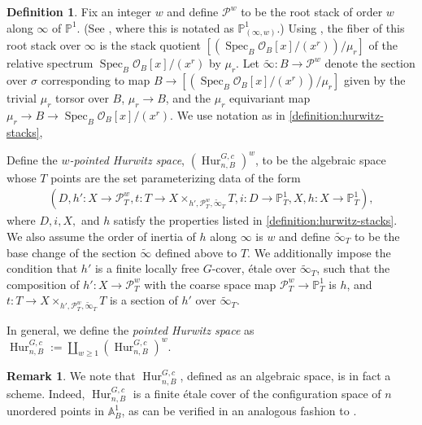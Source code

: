 \documentclass[12 pt]{amsart}
\theoremstyle{plain}
\theoremstyle{definition}
\newtheorem{definition}[theorem]{Definition}
\newtheorem{remark}[theorem]{Remark}
\theoremstyle{remark}
\numberwithin{equation}{section}
\DeclareMathOperator\spec{Spec}
\newcommand{\phur}[4]{\operatorname{Hur}^{#1, #3}_{#2,#4}}
\begin{document}
\begin{definition}
	\label{definition:pointed-hurwitz-space}
	Fix an integer $w$ and define $\mathscr P^w$ to be the root stack of order $w$ along
	$\infty$ of $\mathbb P^1$. (See \cite[Definition
		2.2.4]{cadman:using-stacks-to-impose-tangency}, where this is
	notated as $\mathbb P^1_{(\infty, w)}$.) 
	Using \cite[Theorem 10.3.10(ii)]{olsson2016algebraic}, 
	the fiber of this root
	stack over $\infty$ is the stack quotient 
$[\left(\spec_B \mathscr O_B[x]/(x^r)\right)/ \mu_r]$ of the relative spectrum $\spec_B \mathscr
O_B[x]/(x^r)$ by $\mu_r$. Let $\widetilde{\infty} : B \to \mathscr P^w$ denote the section over $\sigma$ corresponding to map $B
	\to [\left(\spec_B \mathscr
	O_B[x]/(x^r) \right)/ \mu_r]$ given by the trivial $\mu_r$ torsor over
	$B$, $\mu_{r} \to
	B$, and the $\mu_r$ equivariant map $\mu_{r} \to B \to \spec_B \mathscr
	O_B[x]/(x^r)$.
	We use notation as in \autoref{definition:hurwitz-stacks},

	Define the {\em $w$-pointed Hurwitz space}, $\left(\phur G n c B
	\right)^w$, to be the algebraic space
	whose $T$ points are the set parameterizing data of the form
	\begin{align*}
		\left( D, h': X \to \mathscr
		P^w_T, t: T \to X
		\times_{h',\mathscr P^w_T, \widetilde{\infty}_T} T, i:
	D \to \mathbb P^1_T, X, h: X \to \mathbb P^1_T  \right),
	\end{align*}
	where $D, i,X,$ and $h$ satisfy the properties listed in
\autoref{definition:hurwitz-stacks}. We also assume the order of inertia of $h$
	along $\infty$ is $w$ and define
	$\widetilde{\infty}_T$ to be the base change of the section
	$\widetilde{\infty}$ defined above to $T$.
	We additionally impose the condition that
	$h'$ is a finite locally free $G$-cover, \'etale over
	$\widetilde{\infty}_T$, such that the composition of $h': X \to \mathscr
		P^w_T$ with the coarse
		space map $\mathscr P^w_T \to \mathbb P^1_T$ is $h$,
		and $t: T \to X \times_{h',\mathscr P^w_T,
		\widetilde{\infty}_T} T$
		is a section of $h'$ over $\widetilde{\infty}_T$.

		In general, we define the {\em pointed Hurwitz space} as $\phur G
		n c B := \coprod_{w \geq 1} \left(\phur G n c B\right)^w.$
\end{definition}
\begin{remark}
	\label{remark:}
	We note that 
	$\phur G n c B$, defined as an algebraic space, is in fact a scheme. 
	Indeed, $\phur G n c B$ is a finite
	\'etale cover of the configuration space of $n$ unordered points in $\mathbb A^1_B$, as
	can be verified in an analogous fashion to \cite[Proposition
	11.4]{liuWZB:a-predicted-distribution}.
\end{remark}
\end{document}
